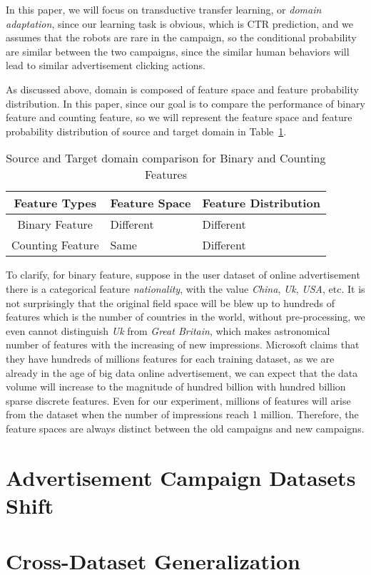 In this paper, we will focus on transductive transfer learning, or \textit{domain adaptation}, since our learning task is obvious, which is CTR prediction, and we assumes that the robots are rare in the campaign, so the conditional probability are similar between the two campaigns, since the similar human behaviors will lead to similar advertisement clicking actions. 

As discussed above, domain is composed of feature space and feature probability distribution. In this paper, since our goal is to compare the performance of binary feature and counting feature, so we will represent the feature space and feature probability distribution of source and target domain in Table~\ref{tab:domainadapt}.

\begin{table}[t]
\begin{tabular}{ c | l | l }
Feature Types & Feature Space & Feature Distribution \\
\hline \hline
Binary Feature & Different & Different  \\
Counting Feature & Same & Different
\end{tabular}
\caption{Source and Target domain comparison for Binary and Counting Features}
\label{tab:domainadapt}
\end{table}

To clarify, for binary feature, suppose in the user dataset of online advertisement there is a categorical feature \textit{nationality}, with the value \textit{China}, \textit{Uk}, \textit{USA}, etc. It is not surprisingly that the original field space will be blew up to hundreds of features which is the number of countries in the world, without pre-processing, we even cannot distinguish \textit{Uk} from \textit{Great Britain}, which makes astronomical number of features with the increasing of new impressions. Microsoft claims that they have hundreds of millions features \cite{graepel2010web} for each training dataset, as we are already in the age of big data online advertisement, we can expect that the data volume will increase to the magnitude of hundred billion with hundred billion sparse discrete features. Even for our experiment, millions of features will arise from the dataset when the number of impressions reach 1 million. Therefore, the feature spaces are always distinct between the old campaigns and new campaigns. 









\section{Advertisement Campaign Datasets Shift}

\section{Cross-Dataset Generalization}

